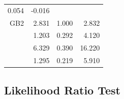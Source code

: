 \documentclass[]{book}
\theoremstyle{definition}
\theoremstyle{definition}
\theoremstyle{definition}
\theoremstyle{remark}
\begin{document}
\begin{longtable}[]{@{}rrrr@{}}
\begin{minipage}[t]{0.24\columnwidth}
0.054\strut
\end{minipage} & \begin{minipage}[t]{0.24\columnwidth}\raggedleft\strut
-0.016\strut
\end{minipage}\tabularnewline
GB2 & 2.831 & 1.000 & 2.832\tabularnewline
\begin{minipage}[t]{0.24\columnwidth}\raggedleft\strut
\strut
\end{minipage} & \begin{minipage}[t]{0.24\columnwidth}\raggedleft\strut
1.203\strut
\end{minipage} & \begin{minipage}[t]{0.24\columnwidth}\raggedleft\strut
0.292\strut
\end{minipage} & \begin{minipage}[t]{0.24\columnwidth}\raggedleft\strut
4.120\strut
\end{minipage}\tabularnewline
\begin{minipage}[t]{0.24\columnwidth}\raggedleft\strut
\strut
\end{minipage} & \begin{minipage}[t]{0.24\columnwidth}\raggedleft\strut
6.329\strut
\end{minipage} & \begin{minipage}[t]{0.24\columnwidth}\raggedleft\strut
0.390\strut
\end{minipage} & \begin{minipage}[t]{0.24\columnwidth}\raggedleft\strut
16.220\strut
\end{minipage}\tabularnewline
\begin{minipage}[t]{0.24\columnwidth}\raggedleft\strut
\strut
\end{minipage} & \begin{minipage}[t]{0.24\columnwidth}\raggedleft\strut
1.295\strut
\end{minipage} & \begin{minipage}[t]{0.24\columnwidth}\raggedleft\strut
0.219\strut
\end{minipage} & \begin{minipage}[t]{0.24\columnwidth}\raggedleft\strut
5.910\strut
\end{minipage}\tabularnewline
\bottomrule
\end{longtable}

\subsection{Likelihood Ratio Test}\label{likelihood-ratio-test}
\end{document}
